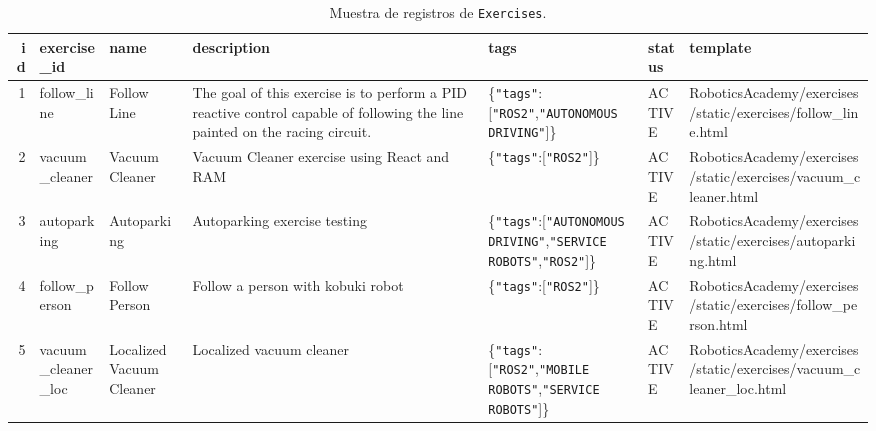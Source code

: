 \documentclass[a4paper, 12pt]{book}
\begin{document}
\begin{table}[!htb]
\centering
\caption{Muestra de registros de \texttt{Exercises}.}
\label{tbl:exercises_sample}
\begin{tabular}{r l l l l l l}
\toprule
\textbf{id} & \textbf{exercise\_id}       & \textbf{name}              & \textbf{description}                                                                                                 & \textbf{tags}                                                         & \textbf{status} & \textbf{template}                                                               \\
\midrule
1  & follow\_line           & Follow Line            & The goal of this exercise is to perform a PID reactive control capable of following the line painted on the racing circuit. & \{\texttt{"tags"}:[\texttt{"ROS2"},\texttt{"AUTONOMOUS DRIVING"}]\}    & ACTIVE         & RoboticsAcademy/exercises/static/exercises/follow\_line.html           \\
2  & vacuum\_cleaner        & Vacuum Cleaner         & Vacuum Cleaner exercise using React and RAM                                                                                    & \{\texttt{"tags"}:[\texttt{"ROS2"}]\}                                  & ACTIVE         & RoboticsAcademy/exercises/static/exercises/vacuum\_cleaner.html        \\
3  & autoparking            & Autoparking            & Autoparking exercise testing                                                                                                    & \{\texttt{"tags"}:[\texttt{"AUTONOMOUS DRIVING"},\texttt{"SERVICE ROBOTS"},\texttt{"ROS2"}]\} & ACTIVE         & RoboticsAcademy/exercises/static/exercises/autoparking.html           \\
4  & follow\_person         & Follow Person          & Follow a person with kobuki robot                                                                                               & \{\texttt{"tags"}:[\texttt{"ROS2"}]\}                                  & ACTIVE         & RoboticsAcademy/exercises/static/exercises/follow\_person.html        \\
5  & vacuum\_cleaner\_loc   & Localized Vacuum Cleaner & Localized vacuum cleaner                                                                                                        & \{\texttt{"tags"}:[\texttt{"ROS2"},\texttt{"MOBILE ROBOTS"},\texttt{"SERVICE ROBOTS"}]\}     & ACTIVE         & RoboticsAcademy/exercises/static/exercises/vacuum\_cleaner\_loc.html \\

\end{tabular}
\end{table}
\end{document}

